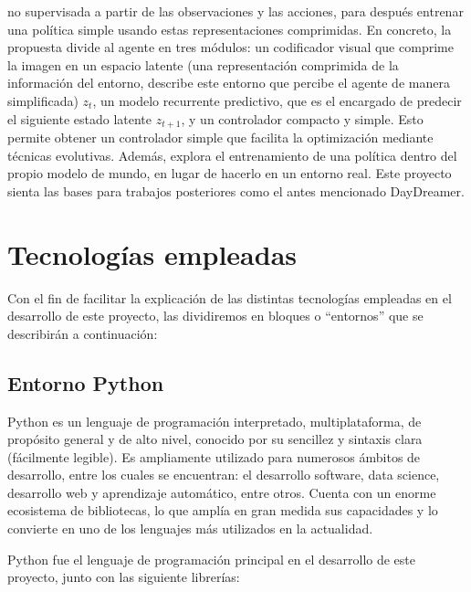 \begin{itemize}
  no supervisada a partir de las observaciones y las acciones, para después entrenar una política simple usando estas 
  representaciones comprimidas. 
  En concreto, la propuesta divide al agente en tres módulos: un codificador visual que comprime la imagen en un espacio 
  latente (una representación comprimida de la información del entorno, describe este entorno que percibe el agente de manera simplificada) \( z_t \), 
  un modelo recurrente predictivo, que es el encargado de predecir el siguiente estado latente \( z_{t+1} \), y un controlador 
  compacto y simple. Esto permite obtener un controlador simple que facilita la optimización mediante técnicas evolutivas.
  Además, explora el entrenamiento de una política dentro del propio modelo de mundo, en lugar de hacerlo en un entorno real.
  Este proyecto sienta las bases para trabajos posteriores como el antes mencionado DayDreamer.
\end{itemize}


\section{Tecnologías empleadas}
\label{sec:tecnologias_empleadas}

Con el fin de facilitar la explicación de las distintas tecnologías empleadas en el desarrollo de este 
proyecto, las dividiremos en bloques o “entornos” que se describirán a continuación:


\subsection{Entorno Python}
\label{sec:entorno_python}

Python\cite{PythonWeb} es un lenguaje de programación \gls{interpretado}, multiplataforma, de propósito general 
y de alto nivel, conocido por su sencillez y sintaxis clara (fácilmente legible). 
Es ampliamente utilizado para numerosos ámbitos de desarrollo, entre los cuales se encuentran: el desarrollo software, 
data science, desarrollo web y aprendizaje automático, entre otros.
Cuenta con un enorme ecosistema de bibliotecas, lo que amplía en gran medida sus capacidades y lo convierte en uno de los 
lenguajes más utilizados en la actualidad.

Python fue el lenguaje de programación principal en el desarrollo de este proyecto, junto con las siguiente 
librerías:


